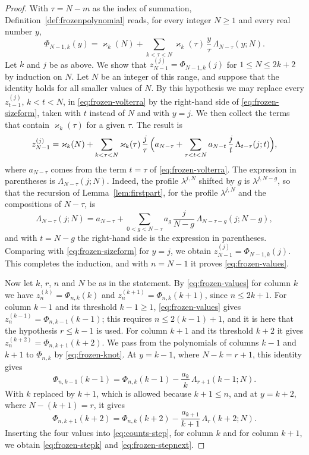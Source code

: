 \documentclass{amsart}
\theoremstyle{definition}
\theoremstyle{remark}
\numberwithin{equation}{section}
\begin{document}
\begin{proof}
With $\tau=N-m$ as the index of summation,
Definition~\ref{def:frozenpolynomial} reads, for every integer $N\ge1$ and
every real number $y$,
\begin{equation}\label{eq:frozen-sizeform}
\Phi_{N-1,k}(y)=\varkappa_k(N)+\sum_{k<\tau<N}\varkappa_k(\tau)\,
\frac{y}{\tau}\,\Lambda_{N-\tau}(y;N).
\end{equation}
Let $k$ and $j$ be as above. We show that $z^{(j)}_{N-1}=\Phi_{N-1,k}(j)$
for $1\le N\le 2k+2$ by induction on $N$. Let $N$ be an integer of this
range, and suppose that the identity holds for all smaller values of $N$.
By this hypothesis we may replace every $z^{(j)}_{t-1}$, $k<t<N$, in
\eqref{eq:frozen-volterra} by the right-hand side of
\eqref{eq:frozen-sizeform}, taken with $t$ instead of $N$ and with $y=j$.
We then collect the terms that contain $\varkappa_k(\tau)$ for a given
$\tau$. The result is
\[
z^{(j)}_{N-1}=\varkappa_k(N)+\sum_{k<\tau<N}\varkappa_k(\tau)\,\frac{j}{\tau}\,
\Bigl(a_{N-\tau}+\sum_{\tau<t<N}a_{N-t}\,\frac{j}{t}\,\Lambda_{t-\tau}(j;t)\Bigr),
\]
where $a_{N-\tau}$ comes from the term $t=\tau$ of
\eqref{eq:frozen-volterra}. The
expression in parentheses is $\Lambda_{N-\tau}(j;N)$. Indeed, the profile
$\lambda^{j,N}$ shifted by $g$ is $\lambda^{j,N-g}$, so that the recursion
of Lemma~\ref{lem:firstpart}, for the profile $\lambda^{j,N}$ and the
compositions of $N-\tau$, is
\[
\Lambda_{N-\tau}(j;N)=a_{N-\tau}+\sum_{0<g<N-\tau}a_g\,\frac{j}{N-g}\,
\Lambda_{N-\tau-g}(j;N-g),
\]
and with $t=N-g$ the right-hand side is the expression in parentheses.
Comparing with \eqref{eq:frozen-sizeform} for $y=j$, we obtain
$z^{(j)}_{N-1}=\Phi_{N-1,k}(j)$. This completes the induction, and with
$n=N-1$ it proves \eqref{eq:frozen-values}.

Now let $k$, $r$, $n$ and $N$ be as in the statement. By
\eqref{eq:frozen-values} for column $k$ we have $z^{(k)}_n=\Phi_{n,k}(k)$
and $z^{(k+1)}_n=\Phi_{n,k}(k+1)$, since $n\le 2k+1$. For column $k-1$ and
its threshold $k-1\ge1$, \eqref{eq:frozen-values} gives
$z^{(k-1)}_n=\Phi_{n,k-1}(k-1)$; this requires $n\le 2(k-1)+1$, and it is
here that the hypothesis $r\le k-1$ is used. For column $k+1$ and its
threshold $k+2$ it gives $z^{(k+2)}_n=\Phi_{n,k+1}(k+2)$. We pass from the
polynomials of columns $k-1$ and $k+1$ to $\Phi_{n,k}$ by
\eqref{eq:frozen-knot}. At $y=k-1$, where $N-k=r+1$, this identity gives
\[
\Phi_{n,k-1}(k-1)=\Phi_{n,k}(k-1)-\frac{a_k}{k}\,\Lambda_{r+1}(k-1;N).
\]
With $k$ replaced by $k+1$, which is allowed because $k+1\le n$, and at
$y=k+2$, where $N-(k+1)=r$, it gives
\[
\Phi_{n,k+1}(k+2)=\Phi_{n,k}(k+2)-\frac{a_{k+1}}{k+1}\,\Lambda_{r}(k+2;N).
\]
Inserting the four values into \eqref{eq:counts-step}, for column
$k$ and for column $k+1$, we obtain \eqref{eq:frozen-stepk} and
\eqref{eq:frozen-stepnext}.
\end{proof}
\end{document}
